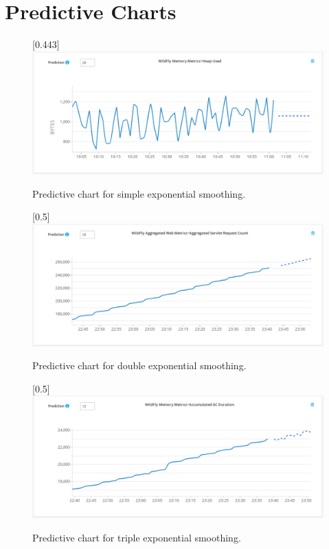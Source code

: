 \chapter{Predictive Charts}
    \begin{figure}[H]
        \begin{center}
            \scalebox{0.6}[0.443]{\includegraphics[angle=90]{img/hawkular-simple.pdf}}
            \caption{Predictive chart for simple exponential smoothing.}
            \label{appen:hawkular-simple}
        \end{center}
    \end{figure}
    \begin{figure}[H]
        \begin{center}
            \scalebox{0.6}[0.5]{\includegraphics[angle=90]{img/hawkular-double.pdf}}
            \caption{Predictive chart for double exponential smoothing.}
            \label{appen:hawkular-double}
        \end{center}
    \end{figure}
    \begin{figure}[H]
        \begin{center}
            \scalebox{0.6}[0.5]{\includegraphics[angle=90]{img/hawkular-triple.pdf}}
            \caption{Predictive chart for triple exponential smoothing.}
            \label{appen:hawkular-triple}
        \end{center}
    \end{figure}

